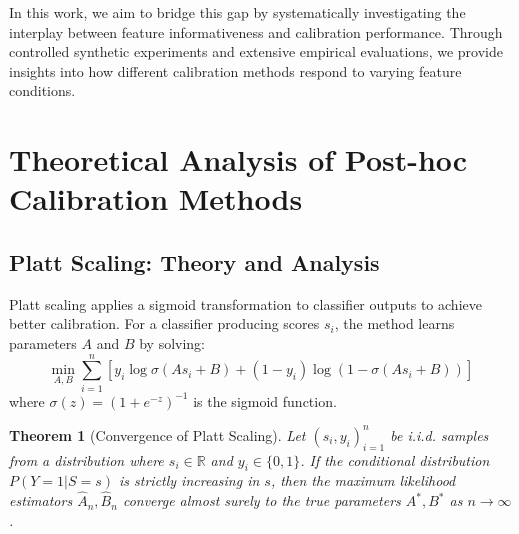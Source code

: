 \documentclass[12pt, a4paper]{article}
\newtheorem{theorem}{Theorem}
\begin{document}
In this work, we aim to bridge this gap by systematically investigating the interplay between feature informativeness and calibration performance. Through controlled synthetic experiments and extensive empirical evaluations, we provide insights into how different calibration methods respond to varying feature conditions. 


\section{Theoretical Analysis of Post-hoc Calibration Methods} \label{sec:TheoreticalAnalysis}

\subsection{Platt Scaling: Theory and Analysis}

Platt scaling applies a sigmoid transformation to classifier outputs to achieve better calibration. For a classifier producing scores $s_i$, the method learns parameters $A$ and $B$ by solving:
\begin{equation}
\min_{A,B} \sum_{i=1}^{n} \left[ y_i \log \sigma(A s_i + B) + (1-y_i) \log(1 - \sigma(A s_i + B)) \right]
\end{equation}
where $\sigma(z) = (1 + e^{-z})^{-1}$ is the sigmoid function.

\begin{theorem}[Convergence of Platt Scaling]
Let $(s_i, y_i)_{i=1}^n$ be i.i.d. samples from a distribution where $s_i \in \mathbb{R}$ and $y_i \in \{0,1\}$. If the conditional distribution $P(Y=1|S=s)$ is strictly increasing in $s$, then the maximum likelihood estimators $\hat{A}_n, \hat{B}_n$ converge almost surely to the true parameters $A^*, B^*$ as $n \to \infty$.
\end{theorem}
\end{document}
